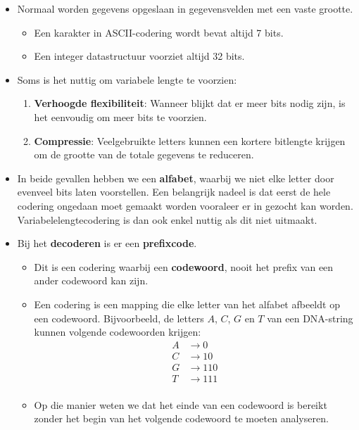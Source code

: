 \begin{itemize}
    \item Normaal worden gegevens opgeslaan  in gegevensvelden met een vaste grootte.
    \begin{itemize}
        \item Een karakter in ASCII-codering wordt bevat altijd 7 bits.
        \item Een integer datastructuur voorziet altijd 32 bits.
    \end{itemize}
    \item Soms is het nuttig om variabele lengte te voorzien:
    \begin{enumerate}
        \item \textbf{Verhoogde flexibiliteit}: Wanneer blijkt dat er meer bits nodig zijn, is het eenvoudig om meer bits te voorzien. 
        \item \textbf{Compressie}: Veelgebruikte letters kunnen een kortere bitlengte krijgen om de grootte van de totale gegevens te reduceren.
    \end{enumerate}
    \item In beide gevallen hebben we een \textbf{alfabet}, waarbij we niet elke letter door evenveel bits laten voorstellen.
    \alert Een belangrijk nadeel is dat eerst de hele codering ongedaan moet gemaakt worden vooraleer er in gezocht kan worden. Variabelelengtecodering is dan ook enkel nuttig als dit niet uitmaakt.
    \item Bij het \textbf{decoderen} is er een \textbf{prefixcode}. 
    \begin{itemize}
        \item Dit is een codering waarbij een \textbf{codewoord}, nooit het prefix van een ander codewoord kan zijn.
        \item Een codering is een mapping die elke letter van het alfabet afbeeldt op een codewoord. Bijvoorbeeld, de letters $A$, $C$, $G$ en $T$ van een DNA-string kunnen volgende codewoorden krijgen:
        \begin{align*}
            A &\rightarrow   0 \\
            C &\rightarrow  10 \\
            G &\rightarrow 110 \\
            T &\rightarrow 111 \\
        \end{align*}
        \item Op die manier weten we dat het einde van een codewoord is bereikt zonder het begin van het volgende codewoord te moeten analyseren.

\end{itemize}
\end{itemize}
